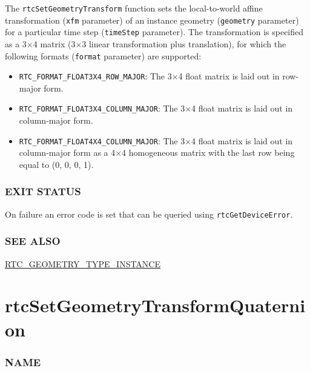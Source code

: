 The \texttt{rtcSetGeometryTransform} function sets the local-to-world
affine transformation (\texttt{xfm} parameter) of an instance geometry
(\texttt{geometry} parameter) for a particular time step
(\texttt{timeStep} parameter). The transformation is specified as a 3×4
matrix (3×3 linear transformation plus translation), for which the
following formats (\texttt{format} parameter) are supported:

\begin{itemize}
\item
  \texttt{RTC\_FORMAT\_FLOAT3X4\_ROW\_MAJOR}: The 3×4 float matrix is
  laid out in row-major form.
\item
  \texttt{RTC\_FORMAT\_FLOAT3X4\_COLUMN\_MAJOR}: The 3×4 float matrix is
  laid out in column-major form.
\item
  \texttt{RTC\_FORMAT\_FLOAT4X4\_COLUMN\_MAJOR}: The 3×4 float matrix is
  laid out in column-major form as a 4×4 homogeneous matrix with the
  last row being equal to (0, 0, 0, 1).
\end{itemize}

\subsubsection{EXIT STATUS}\label{exit-status}

On failure an error code is set that can be queried using
\texttt{rtcGetDeviceError}.

\subsubsection{SEE ALSO}\label{see-also}

\hyperref[rtc_geometry_type_instance]{RTC\_GEOMETRY\_TYPE\_INSTANCE}

\pagebreak

\section{rtcSetGeometryTransformQuaternion}\label{rtcsetgeometrytransformquaternion}

\subsubsection{NAME}\label{name}

\begin{Shaded}
\begin{Highlighting}[]
\OperatorTok{{-}}
\end{Highlighting}
\end{Shaded}

